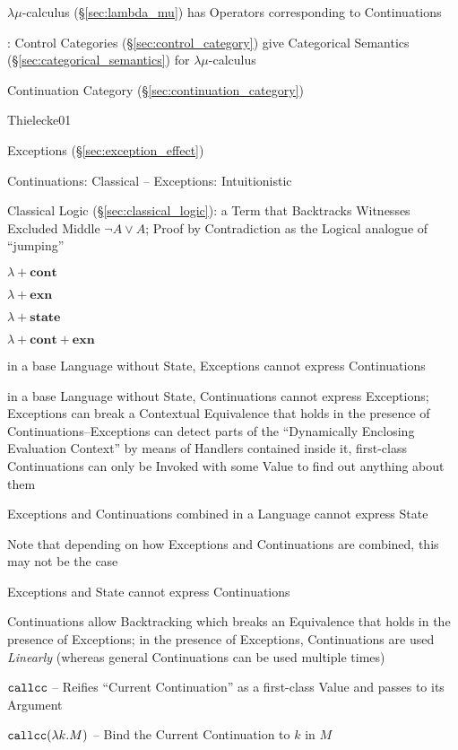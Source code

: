 \asterism


$\lambda\mu$-calculus (\S\ref{sec:lambda_mu}) has Operators
corresponding to Continuations

\cite{selinger01}: Control Categories (\S\ref{sec:control_category})
give Categorical Semantics (\S\ref{sec:categorical_semantics}) for
$\lambda\mu$-calculus

Continuation Category (\S\ref{sec:continuation_category})


\asterism


Thielecke01 %

Exceptions (\S\ref{sec:exception_effect})

Continuations: Classical -- Exceptions: Intuitionistic

Classical Logic (\S\ref{sec:classical_logic}): a Term that Backtracks
Witnesses Excluded Middle $\neg A \vee A$; Proof by Contradiction as
the Logical analogue of ``jumping''

$\lambda + \mathbf{cont}$

$\lambda + \mathbf{exn}$

$\lambda + \mathbf{state}$

$\lambda + \mathbf{cont} + \mathbf{exn}$

in a base Language without State, Exceptions cannot express
Continuations

in a base Language without State, Continuations cannot express
Exceptions; Exceptions can break a Contextual Equivalence that holds
in the presence of Continuations--Exceptions can detect parts of the
``Dynamically Enclosing Evaluation Context'' by means of Handlers
contained inside it, first-class Continuations can only be Invoked
with some Value to find out anything about them

Exceptions and Continuations combined in a Language cannot express
State

\fist Note that depending on how Exceptions and Continuations are
combined, this may not be the case

Exceptions and State cannot express Continuations

Continuations allow Backtracking which breaks an Equivalence that
holds in the presence of Exceptions; in the presence of Exceptions,
Continuations are used \emph{Linearly} (whereas general Continuations
can be used multiple times)

$\mathtt{callcc}$ -- Reifies ``Current Continuation'' as a first-class Value
and passes to its Argument %

$\mathtt{callcc}(\lambda k.M)$ -- Bind the Current Continuation to $k$ in $M$

